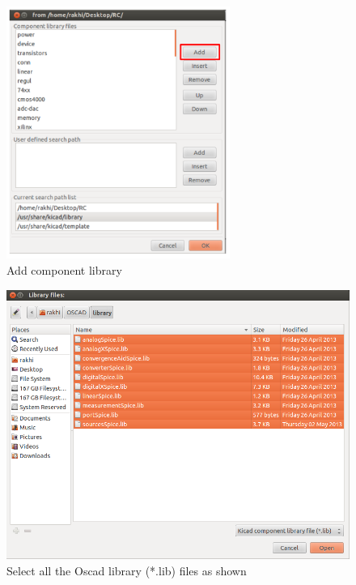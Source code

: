 \begin{figure}
\centering
\includegraphics[width=0.65\textwidth]{figures/lib}
\caption{Add component library}
\label{lib}
\end{figure}
\begin{figure}
\centering
\includegraphics[width=\textwidth]{figures/select}
\caption{Select all the Oscad library (*.lib) files as shown}
\label{chap5select}
\end{figure}

